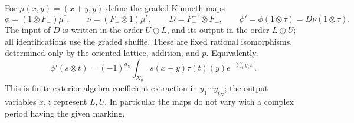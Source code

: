 \documentclass[11pt]{article}
\numberwithin{equation}{section}
\begin{document}
For \(\mu(x,y)=(x+y,y)\) define the graded K\"unneth maps
\begin{equation}
\label{p3sw:spin-eq:fixed-maps}
 \phi=(1\otimes F_-)\mu^*,\qquad
 \nu=(F_-\otimes1)\mu^*,\qquad
 D=F_-^{-1}\otimes F_-,\qquad
 \phi'=\phi(1\otimes\tau)=D\nu(1\otimes\tau).
\end{equation}
The input of \(D\) is written in the order \(U\oplus L\), and its
output in the order \(L\oplus U\); all identifications use the graded
shuffle.  These are fixed rational isomorphisms, determined only by
the oriented lattice, addition, and \(p\).  Equivalently,
\[
 \phi'(s\otimes t)=(-1)^{g_X}\int_{X_y}
          s(x+y)\tau(t)(y)e^{-\sum_i y_i z_i}.
\]
This is finite exterior-algebra coefficient extraction in
\(y_1\cdots y_{\ell_X}\); the output variables \(x,z\) represent \(L,U\).
In particular the maps do not vary with a complex period having the
given marking.
\end{document}
